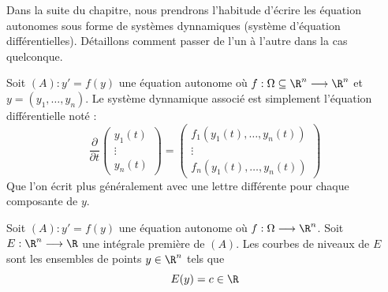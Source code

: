 \newpage 

\begin{proposition}
    Dans la suite du chapitre, nous prendrons l'habitude d'écrire les équation autonomes sous forme de systèmes 
    dynnamiques (système d'équation différentielles). 
    Détaillons comment passer de l'un à l'autre dans la cas quelconque. 
    
    Soit $(A) : y' = f(y)$ une équation autonome où $f : \Omega \subseteq \R^n \longrightarrow \R^n$ et 
    $y = (y_1, \dots, y_n)$. Le système dynnamique associé est simplement l'équation différentielle noté : 
        \[ \frac{\partial}{\partial t} 
        \begin{pmatrix}
            y_1(t) \\ 
            \vdots \\ 
            y_n(t)
        \end{pmatrix}
        = 
        \begin{pmatrix}
            f_1(y_1(t), \dots, y_n(t)) \\ 
            \vdots \\ 
            f_n(y_1(t), \dots, y_n(t)) 
        \end{pmatrix} \] 
    Que l'on écrit plus généralement avec une lettre différente pour chaque composante de $y$. 
\end{proposition}

\begin{definition}
    Soit $(A) : y' = f(y)$ une équation autonome où $f : \Omega \longrightarrow \R^n$. 
    Soit $E : \R^n \longrightarrow \R$ une intégrale première de $(A)$. 
    Les courbes de niveaux de $E$ sont les ensembles de points $y \in \R^n $ tels que 
        \[ E(y) = c \in \R \] 
\end{definition}

